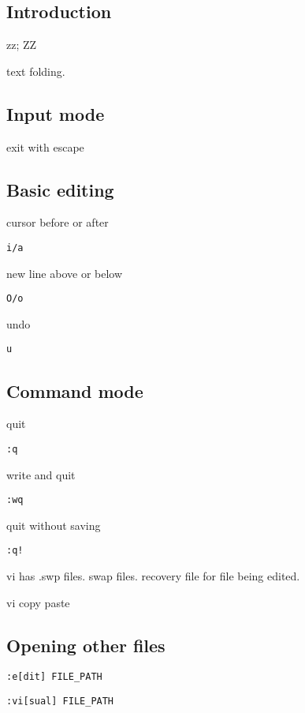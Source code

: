 
\subsection{Introduction}



zz; ZZ

text folding.

\subsection{Input mode}
exit with escape

\subsection{Basic editing}
cursor before or after

\begin{verbatim}
i/a
\end{verbatim}

new line above or below

\begin{verbatim}
O/o
\end{verbatim}


undo
\begin{verbatim}
u
\end{verbatim}


\subsection{Command mode}


quit
\begin{verbatim}
:q
\end{verbatim}

write and quit
\begin{verbatim}
:wq
\end{verbatim}

quit without saving
\begin{verbatim}
:q!
\end{verbatim}


vi has .swp files. swap files. recovery file for file being edited.

vi copy paste


\subsection{Opening other files}

\begin{verbatim}
:e[dit] FILE_PATH
\end{verbatim}

\begin{verbatim}
:vi[sual] FILE_PATH
\end{verbatim}


